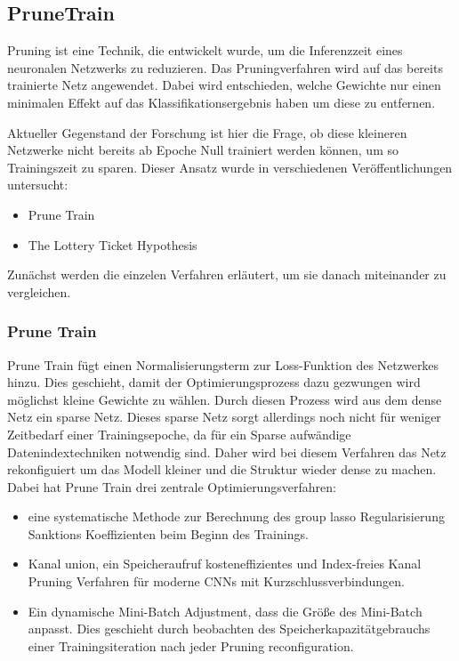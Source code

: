 \subsection{PruneTrain}
Pruning ist eine Technik, die entwickelt wurde, um die Inferenzzeit eines neuronalen Netzwerks zu reduzieren. Das Pruningverfahren wird auf das bereits trainierte Netz angewendet. Dabei wird entschieden, welche Gewichte nur einen minimalen Effekt auf das Klassifikationsergebnis haben um diese zu entfernen.

Aktueller Gegenstand der Forschung ist hier die Frage, ob diese kleineren Netzwerke nicht bereits ab Epoche Null trainiert werden können, um so Trainingszeit zu sparen. Dieser Ansatz wurde in verschiedenen Veröffentlichungen untersucht:
\begin{itemize}
 \item Prune Train 
 \item The Lottery Ticket Hypothesis
\end{itemize}
Zunächst werden die einzelen Verfahren erläutert, um sie danach miteinander zu vergleichen.

\subsubsection{Prune Train}
Prune Train fügt einen Normalisierungsterm zur Loss-Funktion des Netzwerkes hinzu. Dies geschieht, damit der Optimierungsprozess dazu gezwungen wird möglichst kleine Gewichte zu wählen. Durch diesen Prozess wird aus dem dense Netz ein sparse Netz. Dieses sparse Netz sorgt allerdings noch nicht für weniger Zeitbedarf einer Trainingsepoche, da für ein Sparse aufwändige Datenindextechniken notwendig sind. Daher wird bei diesem Verfahren das Netz rekonfiguiert um das Modell kleiner und die Struktur wieder dense zu machen.
Dabei hat Prune Train drei zentrale Optimierungsverfahren:
\begin{itemize}
   \item eine systematische Methode zur Berechnung des group lasso Regularisierung Sanktions Koeffizienten beim Beginn des Trainings.
   \item Kanal union, ein Speicheraufruf kosteneffizientes und Index-freies Kanal Pruning Verfahren für moderne CNNs mit Kurzschlussverbindungen.
   \item Ein dynamische Mini-Batch Adjustment, dass die Größe des Mini-Batch anpasst. Dies geschieht durch beobachten des Speicherkapazitätgebrauchs einer Trainingsiteration nach jeder Pruning reconfiguration.
\end{itemize} 

